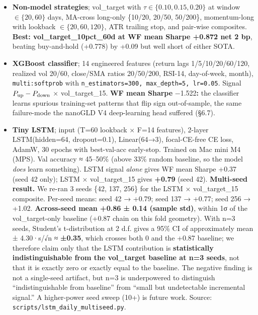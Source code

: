 \documentclass[
]{article}
\providecommand{\tightlist}{%
  \setlength{\itemsep}{0pt}\setlength{\parskip}{0pt}}
\begin{document}
\begin{itemize}
\tightlist
\item
  \textbf{Non-model strategies}; vol\_target with
  \(\tau \in \{0.10, 0.15,
  0.20\}\) at window \(\in \{20, 60\}\) days, MA-cross long-only
  \{10/20, 20/50, 50/200\}, momentum-long with lookback
  \(\in \{20, 60, 120\}\), ATR trailing stop, and pair-wise composites.
  \textbf{Best: vol\_target\_10pct\_60d at WF mean Sharpe +0.872 net 2
  bp}, beating buy-and-hold (+0.778) by +0.09 but well short of either
  SOTA.
\item
  \textbf{XGBoost classifier}; 14 engineered features (return lags
  1/5/10/20/60/120, realized vol 20/60, close/SMA ratios 20/50/200,
  RSI-14, day-of-week, month), \texttt{multi:softprob} with
  \texttt{n\_estimators=300,\ max\_depth=5,\ lr=0.05}. Signal
  \(P_{\rm up} -
  P_{\rm down}\) × vol\_target\_15. \textbf{WF mean Sharpe
  }−1.522\textbf{:} the classifier learns spurious training-set patterns
  that flip sign out-of-sample, the same failure-mode the nanoGLD V4
  deep-learning head suffered (§6.7).
\item
  \textbf{Tiny LSTM}; input (T=60 lookback × F=14 features), 2-layer
  LSTM(hidden=64, dropout=0.1), Linear(64→3), focal-CE-free CE loss,
  AdamW, 30 epochs with best-val-acc early-stop. Trained on Mac mini M4
  (MPS). Val accuracy ≈ 45--50\% (above 33\% random baseline, so the
  model \emph{does} learn something). LSTM signal \emph{alone} gives WF
  mean Sharpe +0.37 (seed 42 only); LSTM × vol\_target\_15 gives
  \textbf{+0.79} (seed 42). \textbf{Multi-seed result.} We re-ran 3
  seeds \{42, 137, 256\} for the LSTM × vol\_target\_15 composite.
  Per-seed means: seed 42 → +0.79; seed 137 → +0.77; seed 256 → +1.02.
  \textbf{Across-seed mean +0.86 ± 0.14 (sample std)}, within 1σ of the
  vol\_target-only baseline (+0.87 chain on this fold geometry). With
  n=3 seeds, Student's t-distribution at 2 d.f. gives a 95\% CI of
  approximately mean ± 4.30·s/√n ≈ \textbf{±0.35}, which crosses both 0
  and the +0.87 baseline; we therefore claim only that the LSTM
  contribution is \textbf{statistically indistinguishable from the
  vol\_target baseline at n=3 seeds}, not that it is exactly zero or
  exactly equal to the baseline. The negative finding is not a
  single-seed artifact, but n=3 is underpowered to distinguish
  ``indistinguishable from baseline'' from ``small but undetectable
  incremental signal.'' A higher-power seed sweep (10+) is future work.
  Source: \texttt{scripts/lstm\_daily\_multiseed.py}.
\end{itemize}
\end{document}
